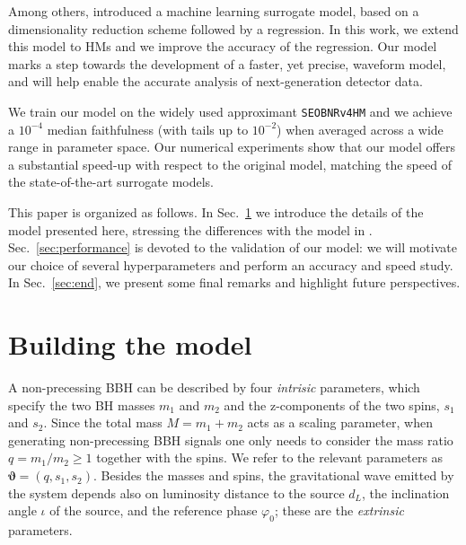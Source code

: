 \documentclass[twocolumn,showpacs,preprintnumbers,nofootinbib,prd,
superscriptaddress,10pt]{revtex4-1}
\begin{document}

Among others, \cite{Schmidt:2020yuu} introduced a machine learning surrogate model, based on a dimensionality 
reduction scheme followed by a regression. In this work, we extend this model to HMs and we improve the accuracy 
of the regression. Our model marks a step towards the development of a faster, yet precise, waveform model, and will 
help enable the accurate analysis of next-generation detector data.

We train our model on the widely used approximant \texttt{SEOBNRv4HM} \cite{Cotesta:2018fcv} and we achieve a 
$10^{-4}$ median faithfulness (with tails up to $10^{-2}$) when averaged across a wide range in parameter space.
Our numerical experiments show that our model offers a substantial speed-up with respect to the original model, matching 
the speed of the state-of-the-art surrogate models.

This paper is organized as follows. In Sec.~\ref{sec:model} we introduce the details of the model presented here, 
stressing the differences with the model in  \cite{Schmidt:2020yuu}.
Sec.~\ref{sec:performance} is devoted to the validation of our model: we will motivate our choice of several 
hyperparameters and perform an accuracy and speed study.
In Sec.~\ref{sec:end}, we present some final remarks and highlight future perspectives.

\section{Building the model}
\label{sec:model}

A non-precessing BBH can be described by four {\it intrisic} parameters, which specify the two BH masses $m_1$ and $m_2$ 
and the z-components of the two spins, $s_1$ and $s_2$.
Since the total mass $M = m_1 + m_2$ acts as a scaling parameter, when generating non-precessing BBH signals one  
only needs to consider the mass ratio $q = m_1/m_2 \geq 1$ together with the spins. 
We refer to the relevant parameters as $\boldsymbol{\vartheta} = (q, s_1, s_2)$.
Besides the masses and spins, the gravitational wave emitted by the system depends also on 
luminosity distance to the source $d_L$, the inclination angle $\iota$ of the source, and the reference phase 
$\varphi_0$; these are the {\it extrinsic} parameters.
\end{document}
